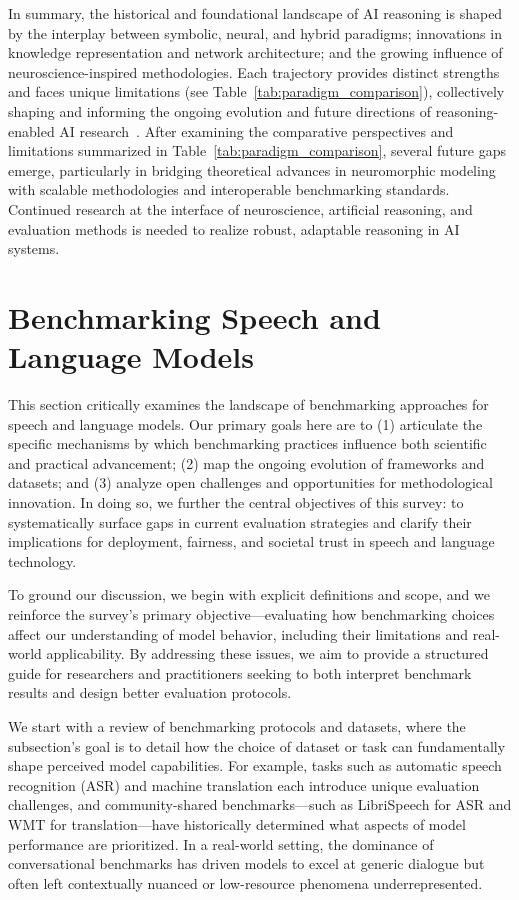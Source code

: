 \documentclass[sigconf]{acmart}
\begin{document}
In summary, the historical and foundational landscape of AI reasoning is shaped by the interplay between symbolic, neural, and hybrid paradigms; innovations in knowledge representation and network architecture; and the growing influence of neuroscience-inspired methodologies. Each trajectory provides distinct strengths and faces unique limitations (see Table~\ref{tab:paradigm_comparison}), collectively shaping and informing the ongoing evolution and future directions of reasoning-enabled AI research~\cite{ref42,ref49,ref54,ref86,ref90,ref100}. After examining the comparative perspectives and limitations summarized in Table~\ref{tab:paradigm_comparison}, several future gaps emerge, particularly in bridging theoretical advances in neuromorphic modeling with scalable methodologies and interoperable benchmarking standards. Continued research at the interface of neuroscience, artificial reasoning, and evaluation methods is needed to realize robust, adaptable reasoning in AI systems.

\section{Benchmarking Speech and Language Models}

This section critically examines the landscape of benchmarking approaches for speech and language models. Our primary goals here are to (1) articulate the specific mechanisms by which benchmarking practices influence both scientific and practical advancement; (2) map the ongoing evolution of frameworks and datasets; and (3) analyze open challenges and opportunities for methodological innovation. In doing so, we further the central objectives of this survey: to systematically surface gaps in current evaluation strategies and clarify their implications for deployment, fairness, and societal trust in speech and language technology.

To ground our discussion, we begin with explicit definitions and scope, and we reinforce the survey’s primary objective—evaluating how benchmarking choices affect our understanding of model behavior, including their limitations and real-world applicability. By addressing these issues, we aim to provide a structured guide for researchers and practitioners seeking to both interpret benchmark results and design better evaluation protocols.

We start with a review of benchmarking protocols and datasets, where the subsection’s goal is to detail how the choice of dataset or task can fundamentally shape perceived model capabilities. For example, tasks such as automatic speech recognition (ASR) and machine translation each introduce unique evaluation challenges, and community-shared benchmarks—such as LibriSpeech for ASR and WMT for translation—have historically determined what aspects of model performance are prioritized. In a real-world setting, the dominance of conversational benchmarks has driven models to excel at generic dialogue but often left contextually nuanced or low-resource phenomena underrepresented.
\end{document}
